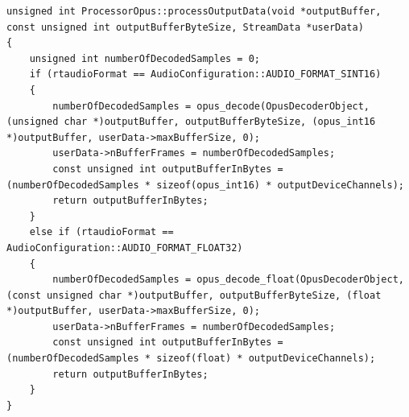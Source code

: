 \begin{lstlisting}[caption={Decodieren von Audio Daten mittels Opus},label={Code:Opus}]
unsigned int ProcessorOpus::processOutputData(void *outputBuffer, const unsigned int outputBufferByteSize, StreamData *userData)
{
    unsigned int numberOfDecodedSamples = 0;
    if (rtaudioFormat == AudioConfiguration::AUDIO_FORMAT_SINT16)
    {
        numberOfDecodedSamples = opus_decode(OpusDecoderObject, (unsigned char *)outputBuffer, outputBufferByteSize, (opus_int16 *)outputBuffer, userData->maxBufferSize, 0);
        userData->nBufferFrames = numberOfDecodedSamples;
        const unsigned int outputBufferInBytes = (numberOfDecodedSamples * sizeof(opus_int16) * outputDeviceChannels);
        return outputBufferInBytes;
    }
    else if (rtaudioFormat == AudioConfiguration::AUDIO_FORMAT_FLOAT32)
    {
        numberOfDecodedSamples = opus_decode_float(OpusDecoderObject, (const unsigned char *)outputBuffer, outputBufferByteSize, (float *)outputBuffer, userData->maxBufferSize, 0);
        userData->nBufferFrames = numberOfDecodedSamples;
        const unsigned int outputBufferInBytes = (numberOfDecodedSamples * sizeof(float) * outputDeviceChannels);
        return outputBufferInBytes;
    }
}
\end{lstlisting}

\FloatBarrier
